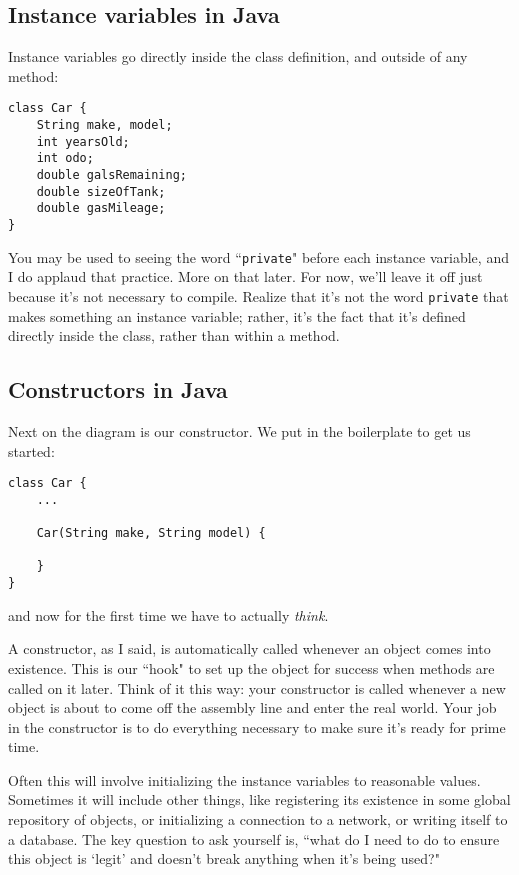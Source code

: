 \subsection{Instance variables in Java}

Instance variables go directly inside the class definition, and outside of any
method:

\begin{Verbatim}[samepage=true,fontsize=\footnotesize,frame=single]
class Car {
    String make, model;
    int yearsOld;
    int odo;
    double galsRemaining;
    double sizeOfTank;
    double gasMileage;    
}
\end{Verbatim}

You may be used to seeing the word ``\texttt{private}" before each instance
variable, and I do applaud that practice. More on that later. For now, we'll
leave it off just because it's not necessary to compile. Realize that it's not
the word \texttt{private} that makes something an instance variable; rather,
it's the fact that it's defined directly inside the class, rather than within
a method.

\subsection{Constructors in Java}

Next on the diagram is our constructor. We put in the boilerplate to get us
started:

\begin{Verbatim}[samepage=true,fontsize=\footnotesize,frame=single]
class Car {
    ...

    Car(String make, String model) {

    }
}
\end{Verbatim}

and now for the first time we have to actually \textit{think}.

A constructor, as I said, is automatically called whenever an object comes
into existence. This is our ``hook" to set up the object for success when
methods are called on it later. Think of it this way: your constructor is
called whenever a new object is about to come off the assembly line and enter
the real world. Your job in the constructor is to do everything necessary to
make sure it's ready for prime time.

Often this will involve initializing the instance variables to reasonable
values. Sometimes it will include other things, like registering its existence
in some global repository of objects, or initializing a connection to a
network, or writing itself to a database. The key question to ask yourself is,
``what do I need to do to ensure this object is `legit' and doesn't break
anything when it's being used?"

